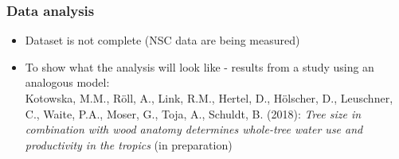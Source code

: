 \documentclass[usepdftitle=false]{beamer}
\newcommand{\blue}[1]{{\color{blue!50!black}#1}}
\begin{document}
\begin{frame}
	\frametitle{Data analysis}
	\begin{itemize}
		\item Dataset is not complete (NSC data are being measured)
		\item<2-> To show what the analysis will look like - results from a study using an analogous model:\\
		
		\vspace{1em} \blue{Kotowska, M.M., Röll, A., \alert{Link, R.M.,} Hertel, D., Hölscher, D., Leuschner, C., Waite, P.A., Moser, G., Toja, A., Schuldt, B. (2018):} \textit{Tree size in combination with wood anatomy determines whole-tree water use and productivity in the tropics} (in preparation)		
		
	\end{itemize}
\end{frame}
\end{document}
